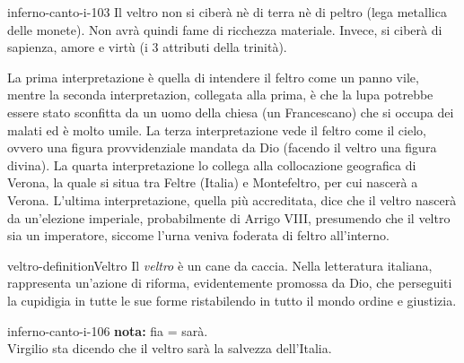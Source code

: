 \documentclass[preview]{standalone}
\begin{document}
\begin{snippet}{inferno-canto-i-103}
    Il veltro non si ciberà nè di terra nè di peltro (lega metallica delle monete).
    Non avrà quindi fame di ricchezza materiale.
    Invece, si ciberà di sapienza, amore e virtù (i 3 attributi della trinità).

    La prima interpretazione è quella di intendere il feltro come un panno vile,
    mentre la seconda interpretazion, collegata alla prima, è che la lupa potrebbe
    essere stato sconfitta da un uomo della chiesa (un Francescano) che si occupa dei malati
    ed è molto umile. La terza interpretazione vede il feltro come il cielo, ovvero una figura provvidenziale
    mandata da Dio (facendo il veltro una figura divina). La quarta interpretazione
    lo collega alla collocazione geografica di Verona, la quale si situa tra Feltre (Italia) e Montefeltro, per cui
    nascerà a Verona.
    L'ultima interpretazione, quella più accreditata, dice che il veltro nascerà da un'elezione imperiale,
    probabilmente di Arrigo VIII, presumendo che il veltro sia un imperatore, siccome l'urna
    veniva foderata di feltro all'interno.
\end{snippet}

\begin{snippetdefinition}{veltro-definition}{Veltro}
    Il \textit{veltro} è un cane da caccia.
    Nella letteratura italiana, rappresenta un'azione di riforma,
    evidentemente promossa da Dio, che perseguiti la cupidigia in tutte le sue forme
    ristabilendo in tutto il mondo ordine e giustizia. 
\end{snippetdefinition}

\begin{snippet}{inferno-canto-i-106}
    \textbf{\color{red}nota:} fia = sarà. \\
    Virgilio sta dicendo che il veltro sarà la salvezza dell'Italia.
\end{snippet}
\end{document}
